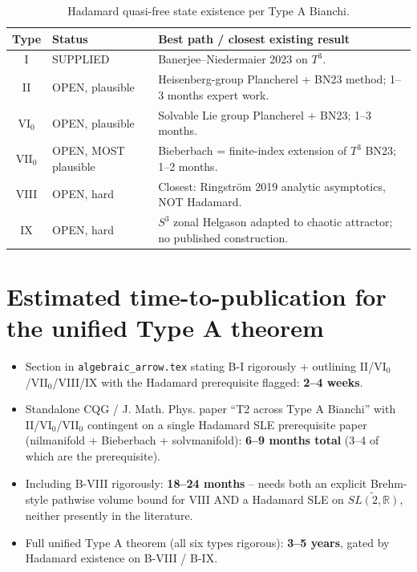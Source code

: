 \documentclass[11pt,a4paper]{article}
\theoremstyle{definition}
\newcommand{\R}{\mathbb{R}}
\begin{document}
\begin{table}[ht]
\centering
\begin{tabular}{|c|p{4cm}|p{8cm}|}
\hline
Type   & Status & Best path / closest existing result \\
\hline
I      & SUPPLIED & Banerjee--Niedermaier 2023 \cite{BN2023} on $T^3$. \\
II     & OPEN, plausible & Heisenberg-group Plancherel
                     \cite{Stein1965,Geller1980,Folland1982} + BN23 method;
                     1--3 months expert work. \\
VI$_0$ & OPEN, plausible & Solvable Lie group Plancherel + BN23;
                     1--3 months. \\
VII$_0$ & OPEN, MOST plausible & Bieberbach = finite-index extension of
                     $T^3$ BN23; 1--2 months. \\
VIII   & OPEN, hard & Closest: Ringstr\"om 2019 \cite{Ringstrom2019}
                     analytic asymptotics, NOT Hadamard. \\
IX     & OPEN, hard & $S^3$ zonal Helgason adapted to chaotic attractor;
                     no published construction. \\
\hline
\end{tabular}
\caption{Hadamard quasi-free state existence per Type A Bianchi.}
\label{tab:hadamard}
\end{table}

\section{Estimated time-to-publication for the unified Type A theorem}

\begin{itemize}
  \item Section in \texttt{algebraic\_arrow.tex} stating B-I rigorously +
        outlining II/VI$_0$/VII$_0$/VIII/IX with the Hadamard prerequisite
        flagged: \textbf{2--4 weeks}.
  \item Standalone CQG / J. Math. Phys. paper ``T2 across Type A Bianchi''
        with II/VI$_0$/VII$_0$ contingent on a single Hadamard SLE
        prerequisite paper (nilmanifold + Bieberbach + solvmanifold):
        \textbf{6--9 months total} (3--4 of which are the prerequisite).
  \item Including B-VIII rigorously: \textbf{18--24 months} -- needs both
        an explicit Brehm-style pathwise volume bound for VIII AND a
        Hadamard SLE on $\widetilde{SL(2,\R)}$, neither presently in the
        literature.
  \item Full unified Type A theorem (all six types rigorous): \textbf{3--5
        years}, gated by Hadamard existence on B-VIII / B-IX.
\end{itemize}
\end{document}
